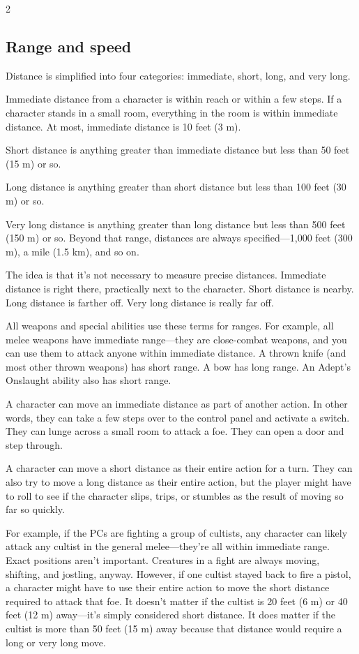 \begin{multicols}{2}
\subsection{Range and speed}

Distance is simplified into four categories: immediate, short, long, and very long.

Immediate distance from a character is within reach or within a few steps. If a character stands in a small room, everything in the room is within immediate distance. At most, immediate distance is 10 feet (3 m).

Short distance is anything greater than immediate distance but less than 50 feet (15 m) or so. 

Long distance is anything greater than short distance but less than 100 feet (30 m) or so. 

Very long distance is anything greater than long distance but less than 500 feet (150 m) or so. Beyond that range, distances are always specified—1,000 feet (300 m), a mile (1.5 km), and so on.

The idea is that it’s not necessary to measure precise distances. Immediate distance is right there, practically next to the character. Short distance is nearby. Long distance is farther off. Very long distance is really far off.

All weapons and special abilities use these terms for ranges. For example, all melee weapons have immediate range—they are close-combat weapons, and you can use them to attack anyone within immediate distance. A thrown knife (and most other thrown weapons) has short range. A bow has long range. An Adept’s Onslaught ability also has short range.

A character can move an immediate distance as part of another action. In other words, they can take a few steps over to the control panel and activate a switch. They can lunge across a small room to attack a foe. They can open a door and step through.

A character can move a short distance as their entire action for a turn. They can also try to move a long distance as their entire action, but the player might have to roll to see if the character slips, trips, or stumbles as the result of moving so far so quickly.

For example, if the PCs are fighting a group of cultists, any character can likely attack any cultist in the general melee—they’re all within immediate range. Exact positions aren’t important. Creatures in a fight are always moving, shifting, and jostling, anyway. However, if one cultist stayed back to fire a pistol, a character might have to use their entire action to move the short distance required to attack that foe. It doesn’t matter if the cultist is 20 feet (6 m) or 40 feet (12 m) away—it’s simply considered short distance. It does matter if the cultist is more than 50 feet (15 m) away because that distance would require a long or very long move.


\end{multicols}
